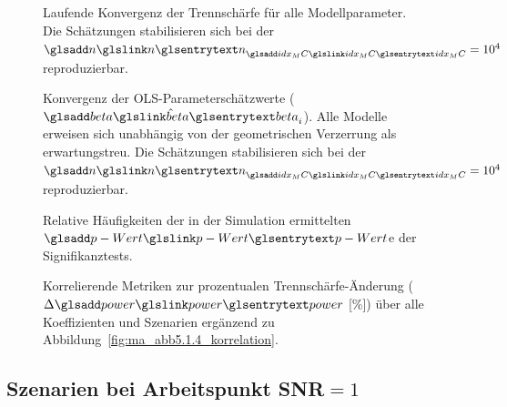 %     


\begin{figure}[htbp]
    \centering
    \setlength{}
    \setlength\figureheight{16cm}
    
    \caption{Laufende Konvergenz der Trennschärfe für alle Modellparameter. Die Schätzungen stabilisieren sich bei der $\sym{n}_{\sym{idx_MC}}=10^4$ reproduzierbar.}
    \label{fig:app.c_conv_power}
\end{figure}

\begin{figure}[htbp]
    \centering
    \setlength{}
    \setlength\figureheight{16cm}
    
    \caption{Konvergenz der \ac{OLS}-Parameterschätzwerte ($\hat{\sym{beta}}_i$). Alle Modelle erweisen sich unabhängig von der geometrischen Verzerrung als erwartungstreu. Die Schätzungen stabilisieren sich bei der $\sym{n}_{\sym{idx_MC}}=10^4$ reproduzierbar.}
    \label{fig:app.c_conv_beta}
\end{figure}

\begin{figure}[htbp]
    \centering
    \setlength{}
    \setlength\figureheight{16cm}
    
    \caption{Relative Häufigkeiten der in der Simulation ermittelten $\sym{p-Wert}$e der Signifikanztests.}
    \label{fig:app.c_pval_hist}
\end{figure}

\begin{figure}[htbp]
    \centering
    \setlength{}
    \setlength\figureheight{19cm}
    
    \caption{Korrelierende Metriken zur prozentualen Trennschärfe-Änderung ($\Delta \sym{power}$ [\%]) über alle Koeffizienten und Szenarien ergänzend zu Abbildung~\ref{fig:ma_abb5.1.4_korrelation}.}
    \label{fig:app.c_corr_all}
\end{figure}

\clearpage
\subsection{Szenarien bei Arbeitspunkt SNR$=1$} \label{app:c_snr1}

